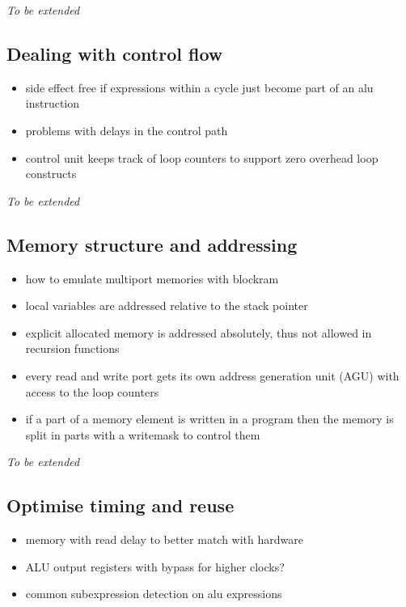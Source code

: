 \documentclass[preprint]{sigplanconf}
\begin{document}
\textit{To be extended}

\subsection{Dealing with control flow}
\begin{itemize}
  \item side effect free if expressions within a cycle just become part of an alu instruction \\
  \item problems with delays in the control path
  \item control unit keeps track of loop counters to support zero overhead loop constructs
\end{itemize}

\textit{To be extended}

\subsection{Memory structure and addressing}

\begin{itemize}
  \item how to emulate multiport memories with blockram
  \item local variables are addressed relative to the stack pointer
  \item explicit allocated memory is addressed absolutely, thus not allowed in recursion functions
  \item every read and write port gets its own address generation unit (AGU) with access to the loop counters
  \item if a part of a memory element is written in a program then the memory is split in parts with a writemask to control them
\end{itemize}

\textit{To be extended}

\subsection{Optimise timing and reuse}
\begin{itemize}
  \item memory with read delay to better match with hardware
  \item ALU output registers with bypass for higher clocks?
  \item common subexpression detection on alu expressions
\end{itemize}
\end{document}
